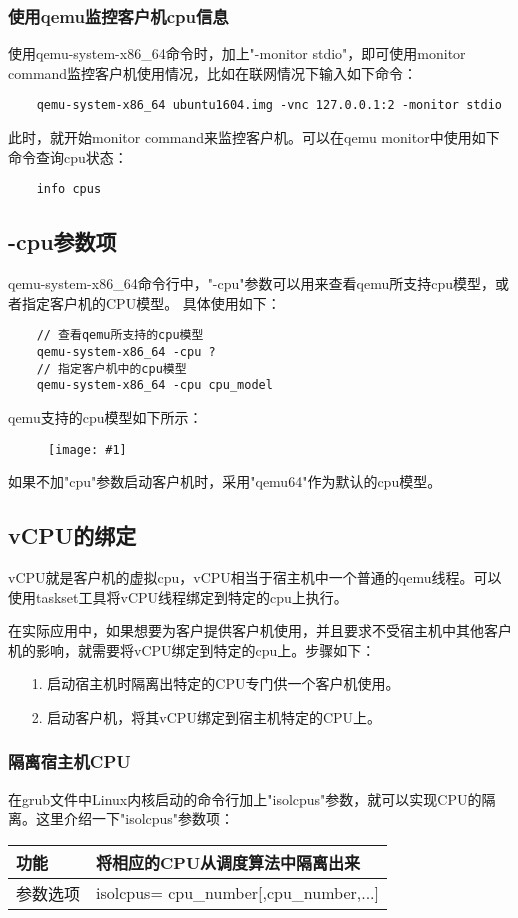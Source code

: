 \documentclass[a4paper,left=2.5cm,right=2.5cm,11pt]{article}
\newcommand{\fic}[1]{\begin{figure}[H]
		\center
		\texttt{[image: \#1]}
	\end{figure}}
\newcommand{\interval}{\vspace{0.5em}}
\newcommand{\tablestart}{
	\interval
	\begin{longtable}{p{2cm}p{10cm}}
	\hline}
\newcommand{\tableend}{
	\hline
	\end{longtable}
	\interval}
\begin{document}
\subsubsection{使用qemu监控客户机cpu信息}
	使用qemu-system-x86\_64命令时，加上"-monitor stdio"，即可使用monitor command监控客户机使用情况，比如在联网情况下输入如下命令：
	\begin{lstlisting}
	qemu-system-x86_64 ubuntu1604.img -vnc 127.0.0.1:2 -monitor stdio
	\end{lstlisting}

	此时，就开始monitor command来监控客户机。可以在qemu monitor中使用如下命令查询cpu状态：
	\begin{lstlisting}
	info cpus
	\end{lstlisting}

\subsection{-cpu参数项}
	qemu-system-x86\_64命令行中，"-cpu"参数可以用来查看qemu所支持cpu模型，或者指定客户机的CPU模型。
	具体使用如下：
	\begin{lstlisting}
	// 查看qemu所支持的cpu模型
	qemu-system-x86_64 -cpu ?
	// 指定客户机中的cpu模型
	qemu-system-x86_64 -cpu cpu_model 
	\end{lstlisting}

	qemu支持的cpu模型如下所示：
	\fic{1.png}

	如果不加"cpu"参数启动客户机时，采用"qemu64"作为默认的cpu模型。

\subsection{vCPU的绑定}
	vCPU就是客户机的虚拟cpu，vCPU相当于宿主机中一个普通的qemu线程。可以使用taskset工具将vCPU线程绑定到特定的cpu上执行。\par
	在实际应用中，如果想要为客户提供客户机使用，并且要求不受宿主机中其他客户机的影响，就需要将vCPU绑定到特定的cpu上。步骤如下：
	\begin{itemize}
		\item[1.] 启动宿主机时隔离出特定的CPU专门供一个客户机使用。
		\item[2.] 启动客户机，将其vCPU绑定到宿主机特定的CPU上。
	\end{itemize}

\subsubsection{隔离宿主机CPU}
	在grub文件中Linux内核启动的命令行加上"isolcpus"参数，就可以实现CPU的隔离。这里介绍一下"isolcpus"参数项：
	\tablestart
	功能 & 将相应的CPU从调度算法中隔离出来\\
	\hline
	参数选项 & isolcpus= cpu\_number[,cpu\_number,...] \\
	\tableend
\end{document}
